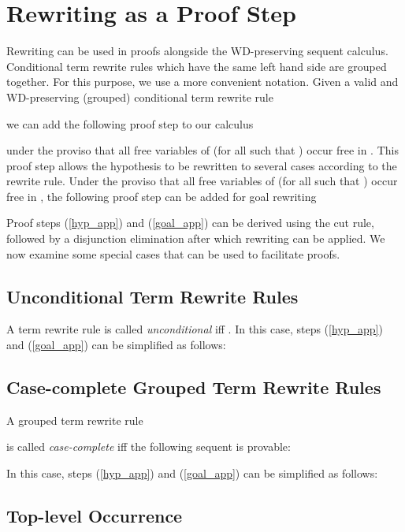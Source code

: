 \documentclass[copyright]{eptcs}
\begin{document}
\section{Rewriting as a Proof Step}\label{pstep}
Rewriting can be used in proofs alongside the WD-preserving sequent calculus. Conditional term rewrite rules which have the same left hand side are grouped together. For this purpose, we use a more convenient notation. Given a valid and WD-preserving (grouped) conditional term rewrite rule

we can add the following proof step to our calculus

under the proviso that all free variables of  (for all  such that ) occur free in . This proof step allows the hypothesis  to be rewritten to several cases according to the rewrite rule.
Under the proviso that all free variables of  (for all  such that ) occur free in , the following proof step can be added for goal rewriting

Proof steps (\ref{hyp_app}) and (\ref{goal_app}) can be derived using the cut rule, followed by a disjunction elimination after which rewriting can be applied. We now examine some special cases that can be used to facilitate proofs.
\subsection{Unconditional Term Rewrite Rules}
A term rewrite rule  is called \textit{unconditional} iff . In this case, steps (\ref{hyp_app}) and (\ref{goal_app}) can be simplified as follows:


\subsection{Case-complete Grouped Term Rewrite Rules}
A grouped term rewrite rule 

is called \textit{case-complete} iff the following sequent is provable:

In this case, steps (\ref{hyp_app}) and (\ref{goal_app}) can be simplified as follows:


\subsection{Top-level Occurrence}
\end{document}
